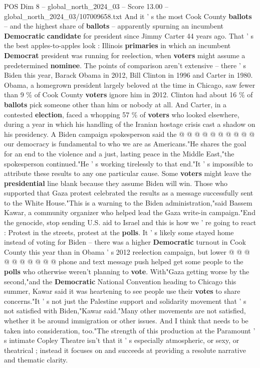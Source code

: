 \begin{textsample}{POS Dim 8 – global\_north\_2024\_03 – Score 13.00 – global\_north\_2024\_03/107009658.txt}
And it ' s the most Cook County \textbf{ballots} -- and the highest share of \textbf{ballots} -- apparently spurning an incumbent \textbf{Democratic} \textbf{candidate} for president since Jimmy Carter 44 years ago.
That ' s the best apples-to-apples look : Illinois \textbf{primaries} in which an incumbent \textbf{Democrat} president was running for reelection, when \textbf{voters} might assume a predetermined \textbf{nominee}.
The points of comparison aren't extensive -- there ' s Biden this year, Barack Obama in 2012, Bill Clinton in 1996 and Carter in 1980.
Obama, a homegrown president largely beloved at the time in Chicago, saw fewer than 9 \% of Cook County \textbf{voters} ignore him in 2012.
Clinton had about 16 \% of \textbf{ballots} pick someone other than him or nobody at all.
And Carter, in a contested \textbf{election}, faced a whopping 57 \% of \textbf{voters} who looked elsewhere, during a year in which his handling of the Iranian hostage crisis cast a shadow on his presidency.
A Biden campaign spokesperson said the @ @ @ @ @ @ @ @ @ @ our democracy is fundamental to who we are as Americans."He shares the goal for an end to the violence and a just, lasting peace in the Middle East,"the spokesperson continued."He ' s working tirelessly to that end."It ' s impossible to attribute these results to any one particular cause.
Some \textbf{voters} might leave the \textbf{presidential} line blank because they assume Biden will win.
Those who supported that Gaza protest celebrated the results as a message successfully sent to the White House."This is a warning to the Biden administration,"said Bassem Kawar, a community organizer who helped lead the Gaza write-in campaign."End the genocide, stop sending U.S. aid to Israel and this is how we ' re going to react : Protest in the streets, protest at the \textbf{polls}.
It ' s likely some stayed home instead of voting for Biden -- there was a higher \textbf{Democratic} turnout in Cook County this year than in Obama ' s 2012 reelection campaign, but lower @ @ @ @ @ @ @ @ @ @ phone and text message push helped get some people to the \textbf{polls} who otherwise weren't planning to \textbf{vote}.
With"Gaza getting worse by the second,"and the \textbf{Democratic} National Convention heading to Chicago this summer, Kawar said it was heartening to see people use their \textbf{votes} to share concerns."It ' s not just the Palestine support and solidarity movement that ' s not satisfied with Biden,"Kawar said."Many other movements are not satisfied, whether it be around immigration or other issues.
And I think that needs to be taken into consideration, too."The strength of this production at the Paramount ' s intimate Copley Theatre isn't that it ' s especially atmospheric, or sexy, or theatrical ; instead it focuses on and succeeds at providing a resolute narrative and thematic clarity.

\end{textsample}
